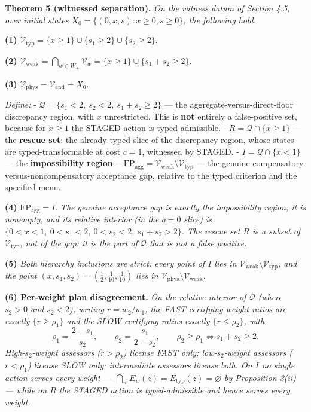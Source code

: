 \documentclass[3p,11pt]{elsarticle}
\begin{document}
\textbf{Theorem 5 (witnessed separation).} \emph{On the witness datum of
Section 4.5, over initial states
\(X_0 = \{(0, x, s) : x \ge 0, s \ge 0\}\), the following hold.}

\textbf{(1)}
\(\mathcal{V}_{\mathrm{typ}} = \{ x \ge 1 \} \cup \{ s_1 \ge 2 \} \cup \{ s_2 \ge 2 \}.\)

\textbf{(2)}
\(\mathcal{V}_{\mathrm{weak}} = \bigcap_{w \in W_+} \mathcal{V}_w = \{ x \ge 1 \} \cup \{ s_1 + s_2 \ge 2 \}.\)

\textbf{(3)}
\(\mathcal{V}_{\mathrm{phys}} = \mathcal{V}_{\mathrm{end}} = X_0.\)

\emph{Define:} -
\(\mathcal{Q} = \{ s_1 < 2,\ s_2 < 2,\ s_1 + s_2 \ge 2 \}\) --- the
aggregate-versus-direct-floor discrepancy region, with \(x\)
unrestricted. This is \textbf{not} entirely a false-positive set,
because for \(x \ge 1\) the STAGED action is typed-admissible. -
\(R = \mathcal{Q} \cap \{ x \ge 1 \}\) --- the \textbf{rescue set}: the
already-typed slice of the discrepancy region, whose states are typed-transformable at cost \(c = 1\), witnessed by STAGED. -
\(I = \mathcal{Q} \cap \{ x < 1 \}\) --- the \textbf{impossibility
region}. -
\(\mathrm{FP}_{\mathrm{agg}} = \mathcal{V}_{\mathrm{weak}} \setminus \mathcal{V}_{\mathrm{typ}}\)
--- the genuine compensatory-versus-noncompensatory acceptance gap,
relative to the typed criterion and the specified menu.

\textbf{(4)} \(\mathrm{FP}_{\mathrm{agg}} = I.\) \emph{The genuine
acceptance gap is exactly the impossibility region; it is nonempty, and
its relative interior (in the \(q = 0\) slice) is
\(\{ 0 < x < 1,\ 0 < s_1 < 2,\ 0 < s_2 < 2,\ s_1 + s_2 > 2 \}\). The
rescue set \(R\) is a subset of \(\mathcal{V}_{\mathrm{typ}}\), not of
the gap: it is the part of \(\mathcal{Q}\) that is not a false
positive.}

\textbf{(5)} \emph{Both hierarchy inclusions are strict: every point of
\(I\) lies in
\(\mathcal{V}_{\mathrm{weak}} \setminus \mathcal{V}_{\mathrm{typ}}\),
and the point \((x, s_1, s_2) = (\tfrac12, \tfrac1{10}, \tfrac1{10})\)
lies in
\(\mathcal{V}_{\mathrm{phys}} \setminus \mathcal{V}_{\mathrm{weak}}\).}

\textbf{(6) Per-weight plan disagreement.} \emph{On the relative
interior of \(\mathcal{Q}\) (where \(s_2 > 0\) and \(s_2 < 2\)), writing
\(r = w_2 / w_1\), the FAST-certifying weight ratios are exactly
\(\{ r \ge \rho_1 \}\) and the SLOW-certifying ratios exactly
\(\{ r \le \rho_2 \}\), with}
\[\rho_1 = \frac{2 - s_1}{s_2}, \qquad \rho_2 = \frac{s_1}{2 - s_2}, \qquad \rho_2 \ge \rho_1 \iff s_1 + s_2 \ge 2.\]
\emph{High-\(s_2\)-weight assessors (\(r > \rho_2\)) license FAST only;
low-\(s_2\)-weight assessors (\(r < \rho_1\)) license SLOW only;
intermediate assessors license both. On \(I\) no single action serves
every weight ---
\(\bigcap_w E_w(z) = E_{\mathrm{typ}}(z) = \varnothing\) by Proposition
3(ii) --- while on \(R\) the STAGED action is typed-admissible and hence
serves every weight.}
\end{document}
